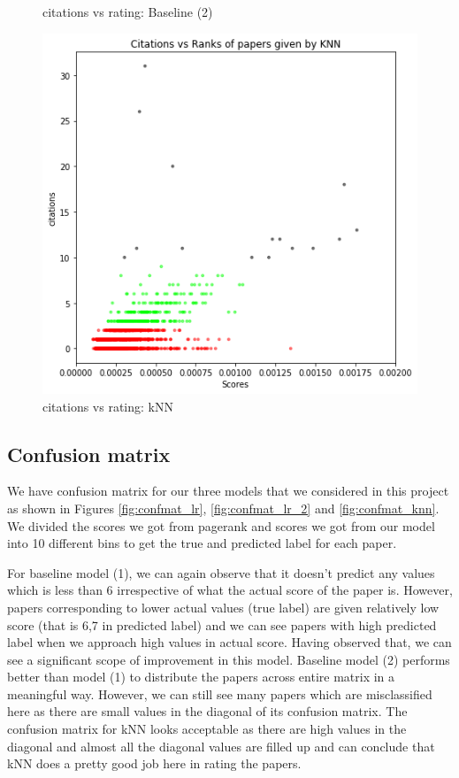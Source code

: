 \documentclass[a4paper, 11pt]{article}
\begin{document}
\begin{figure}[!htb]
    \caption{citations vs rating: Baseline (2)}
    \label{fig:citation_rank_lr}
\endminipage\hfill
{}%
  \includegraphics[width=\linewidth]{citation_rank_knn.png}
    \caption{citations vs rating: kNN}
  \label{fig:citation_rank_knn}
\endminipage
\end{figure}


\subsection{Confusion matrix}
We have confusion matrix for our three models that we considered in this project as shown in Figures \ref{fig:confmat_lr}, \ref{fig:confmat_lr_2} and \ref{fig:confmat_knn}.  We divided the scores we got from pagerank and scores we got from our model into 10 different bins to get the true and predicted label for each paper.
\vspace{0.5cm}

For baseline model (1), we can again observe that it doesn't predict any values which is less than 6 irrespective of what the actual score of the paper is. However, papers corresponding to lower actual values (true label) are given relatively low score (that is 6,7 in predicted label) and we can see papers with high predicted label when we approach high values in actual score. Having observed that, we can see a significant scope of improvement in this model. Baseline model (2) performs better than model (1) to distribute the papers across entire matrix in a meaningful way. However, we can still see many papers which are misclassified here as there are small values in the diagonal of its confusion matrix. The confusion matrix for kNN looks acceptable as there are high values in the diagonal and almost all the diagonal values are filled up and can conclude that kNN does a pretty good job here in rating the papers.
\end{document}
